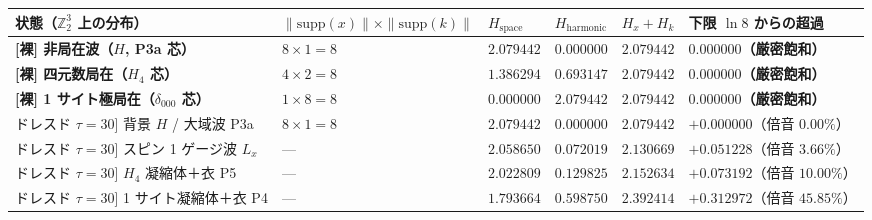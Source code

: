 \documentclass[
  a4paper,
]{ltjsarticle}
\newcounter{none} %
\begin{document}
{\def\LTcaptype{none} %
\begin{longtable}[]{@{}
  >{\raggedright\arraybackslash}p{}
  >{\centering\arraybackslash}p{}
  >{\centering\arraybackslash}p{}
  >{\centering\arraybackslash}p{}
  >{\centering\arraybackslash}p{}
  >{\centering\arraybackslash}p{}@{}}
\toprule\noalign{}
\begin{minipage}[b]{\linewidth}\raggedright
状態（\(\mathbb{Z}_2^3\) 上の分布）
\end{minipage} & \begin{minipage}[b]{\linewidth}\centering
\(\|\mathrm{supp}(x)\| \times \|\mathrm{supp}(k)\|\)
\end{minipage} & \begin{minipage}[b]{\linewidth}\centering
\(H_{\mathrm{space}}\)
\end{minipage} & \begin{minipage}[b]{\linewidth}\centering
\(H_{\mathrm{harmonic}}\)
\end{minipage} & \begin{minipage}[b]{\linewidth}\centering
\(H_x + H_k\)
\end{minipage} & \begin{minipage}[b]{\linewidth}\centering
下限 \(\ln 8\) からの超過
\end{minipage} \\
\midrule\noalign{}
\endhead
\bottomrule\noalign{}
\endlastfoot
\textbf{{[}裸{]} 非局在波（\(H\), P3a 芯）} &
\textbf{\(8 \times 1 = 8\)} & \(2.079442\) & \(0.000000\) &
\textbf{\(2.079442\)} & \textbf{\(0.000000\)（厳密飽和）} \\
\textbf{{[}裸{]} 四元数局在（\(H_4\) 芯）} & \textbf{\(4 \times 2 = 8\)}
& \(1.386294\) & \(0.693147\) & \textbf{\(2.079442\)} &
\textbf{\(0.000000\)（厳密飽和）} \\
\textbf{{[}裸{]} 1 サイト極局在（\(\delta_{000}\) 芯）} &
\textbf{\(1 \times 8 = 8\)} & \(0.000000\) & \(2.079442\) &
\textbf{\(2.079442\)} & \textbf{\(0.000000\)（厳密飽和）} \\
{[}ドレスド \(\tau=30\){]} 背景 \(H\) / 大域波 P3a & \(8 \times 1 = 8\)
& \(2.079442\) & \(0.000000\) & \(2.079442\) & \(+0.000000\)（倍音
\(0.00\%\)） \\
{[}ドレスド \(\tau=30\){]} スピン 1 ゲージ波 \(L_x\) & --- &
\(2.058650\) & \(0.072019\) & \(2.130669\) & \(+0.051228\)（倍音
\(3.66\%\)） \\
{[}ドレスド \(\tau=30\){]} \(H_4\) 凝縮体＋衣 P5 & --- & \(2.022809\) &
\(0.129825\) & \(2.152634\) & \(+0.073192\)（倍音 \(10.00\%\)） \\
{[}ドレスド \(\tau=30\){]} 1 サイト凝縮体＋衣 P4 & --- & \(1.793664\) &
\(0.598750\) & \(2.392414\) & \(+0.312972\)（倍音 \(45.85\%\)） \\
\end{longtable}
}
\end{document}
